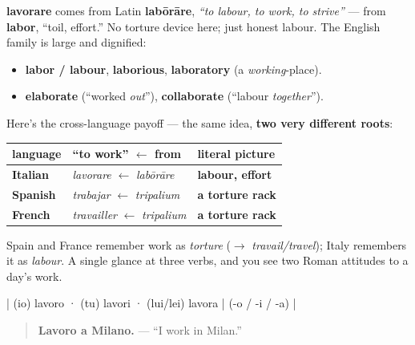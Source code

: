 \begin{cousinweb}
\textbf{lavorare} comes from Latin \textbf{labōrāre}, \emph{\textquotedblleft{}to labour, to work, to strive\textquotedblright{}} — from \textbf{labor}, \textquotedblleft{}toil, effort.\textquotedblright{} No torture device here; just honest labour. The English family is large and dignified:

\begin{itemize}
\raggedright
  \item \textbf{labor / labour}, \textbf{laborious}, \textbf{laboratory} (a \emph{working}-place).
  \item \textbf{elaborate} (\textquotedblleft{}worked \emph{out}\textquotedblright{}), \textbf{collaborate} (\textquotedblleft{}labour \emph{together}\textquotedblright{}).
\end{itemize}

Here's the cross-language payoff — the same idea, \textbf{two very different roots}:

\noindent
\begin{tabularx}{\linewidth}{@{}>{\raggedright\arraybackslash}X>{\raggedright\arraybackslash}X>{\raggedright\arraybackslash}X@{}}
\toprule
\textbf{language} & \textbf{\textquotedblleft{}to work\textquotedblright{} $\leftarrow$ from} & \textbf{literal picture} \\
\midrule
\textbf{Italian} & \emph{lavorare} $\leftarrow$ \emph{labōrāre} & \textbf{labour, effort} \\
\textbf{Spanish} & \emph{trabajar} $\leftarrow$ \emph{tripalium} & \textbf{a torture rack} \\
\textbf{French} & \emph{travailler} $\leftarrow$ \emph{tripalium} & \textbf{a torture rack} \\
\bottomrule
\end{tabularx}

Spain and France remember work as \emph{torture} ($\to$ \emph{travail/travel}); Italy remembers it as \emph{labour}. A single glance at three verbs, and you see two Roman attitudes to a day's work.
\end{cousinweb}

\begin{grammarlens}[title={Grammar Lens: same -are template}]
| (io) lavoro · (tu) lavori · (lui/lei) lavora | (-o / -i / -a) |

\begin{quote}
\textbf{Lavoro a Milano.} — \textquotedblleft{}I work in Milan.\textquotedblright{}
\end{quote}
\end{grammarlens}

